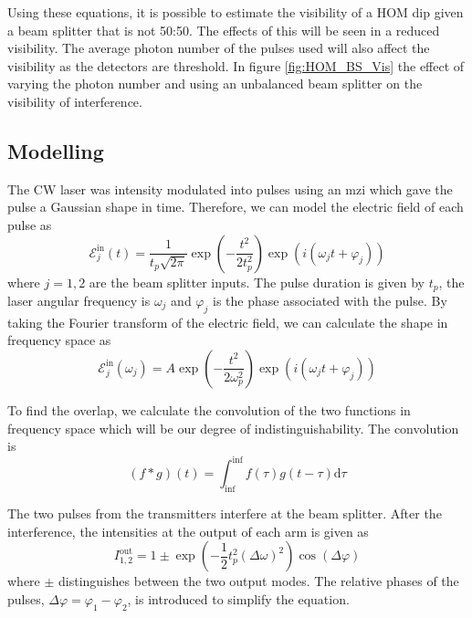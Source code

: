 Using these equations, it is possible to estimate the visibility of a HOM dip given a beam splitter that is not 50:50. The effects of this will be seen in a reduced visibility. The average photon number of the pulses used will also affect the visibility as the detectors are threshold. In figure \ref{fig:HOM_BS_Vis} the effect of varying the photon number and using an unbalanced beam splitter on the visibility of interference.

\subsection{Modelling}

The \ac{CW} laser was intensity modulated into pulses using an \ac{mzi} which gave the pulse a Gaussian shape in time. Therefore, we can model the electric field of each pulse as
\begin{equation}
	\mathcal{E}_j^\text{in}(t) = \frac{1}{t_p\sqrt{2\pi}} \exp{\left(-\frac{t^2}{2 t_p^2}\right)} \exp{\left(i(\omega_j t + \varphi_j)\right)}
\end{equation}
where $j = 1,2$ are the beam splitter inputs. The pulse duration is given by $t_p$, the laser angular frequency is $\omega_j$ and $\varphi_j$ is the phase associated with the pulse. By taking the Fourier transform of the electric field, we can calculate the shape in frequency space as 
\begin{equation}
	\mathcal{E}_j^\text{in}(\omega_j) = A \exp{\left(-\frac{t^2}{2 \omega_p^2}\right)} \exp{\left(i(\omega_j t + \varphi_j)\right)}
\end{equation}

To find the overlap, we calculate the convolution of the two functions in frequency space which will be our degree of indistinguishability. The convolution is 
\begin{equation}
	(f \ast g)(t) = \int^{\inf}_{\inf} f(\tau)g(t - \tau) \text{d}\tau
\end{equation}  

The two pulses from the transmitters interfere at the beam splitter. After the interference, the intensities at the output of each arm is given as
\begin{equation}
	I^\text{out}_{1,2} = 1 \pm \exp{\left(-\frac{1}{2}t_p^2(\Delta\omega)^2\right)}\cos(\Delta\varphi)
\end{equation}
where $\pm$ distinguishes between the two output modes. The relative phases of the pulses, $\Delta\varphi = \varphi_1 - \varphi_2$, is introduced to simplify the equation.

